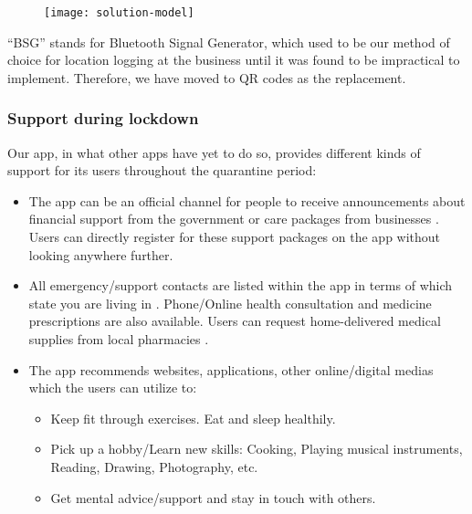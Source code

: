   \begin{figure}[H]
    \centering
    \texttt{[image: solution-model]}
  \end{figure}

  \par ``BSG'' stands for Bluetooth Signal Generator, which used to be our method of choice for location logging at the business until it was found to be impractical to implement. Therefore, we have moved to QR codes as the replacement.

  \subsubsection{Support during lockdown}
  \par Our app, in what other apps have yet to do so, provides different kinds of support for its users throughout the quarantine period:
  \begin{itemize}
    \item The app can be an official channel for people to receive announcements about financial support from the government \parencite{Support5} or care packages from businesses \parencite{Support1}. Users can directly register for these support packages on the app without looking anywhere further.
    \item All emergency/support contacts are listed within the app in terms of which state you are living in \parencite{Support1} \parencite{Support2} \parencite{Support4}. Phone/Online health consultation and medicine prescriptions are also available. Users can request home-delivered medical supplies from local pharmacies \parencite{Support2}.
    \item The app recommends websites, applications, other online/digital medias which the users can utilize to: \parencite{Support3} \parencite{Support4}
      \begin{itemize}
        \item Keep fit through exercises. Eat and sleep healthily.
        \item Pick up a hobby/Learn new skills: Cooking, Playing musical instruments, Reading, Drawing, Photography, etc.
        \item Get mental advice/support and stay in touch with others.
      \end{itemize}
  \end{itemize}

